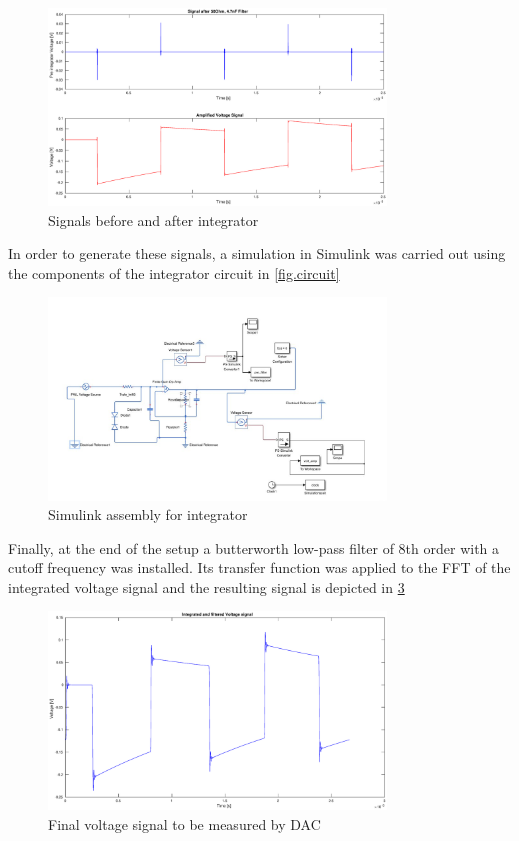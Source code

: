 \begin{figure}[h!tb]
\centerline{\includegraphics[width=0.8\textwidth]{figures/Method/signal_simulation/integrated.eps}}
\caption{Signals before and after integrator}
\label{fig.integrator}
\end{figure}

In order to generate these signals, a simulation in Simulink was carried out using the components of the integrator circuit in \ref{fig.circuit}

\begin{figure}[h!tb]
\centerline{\includegraphics[width=0.8\textwidth]{figures/Method/signal_simulation/simulink.eps}}
\caption{Simulink assembly for integrator}
\label{fig.simulink}
\end{figure}

Finally, at the end of the setup a butterworth low-pass filter of 8th order with a cutoff frequency
was installed. Its transfer function was applied to the FFT of the integrated voltage signal and the resulting 
signal is depicted in \ref{fig.finalvolt}


\begin{figure}[h!tb]
\centerline{\includegraphics[width=0.8\textwidth]{figures/Method/signal_simulation/finalvolt.eps}}
\caption{Final voltage signal to be measured by DAC}
\label{fig.finalvolt}
\end{figure}


